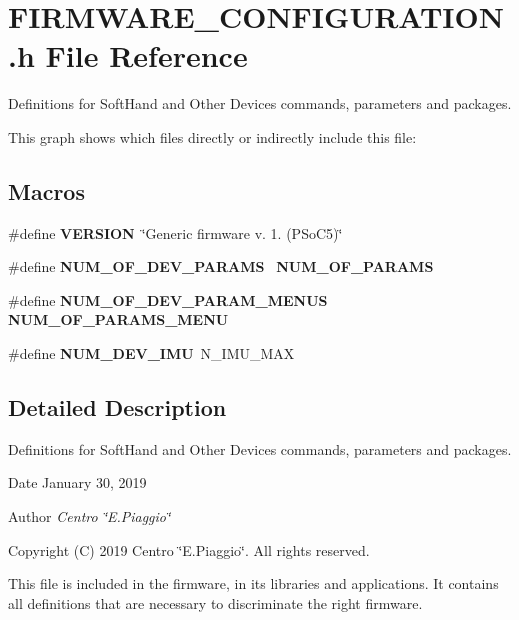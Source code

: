 \section{F\+I\+R\+M\+W\+A\+R\+E\+\_\+\+C\+O\+N\+F\+I\+G\+U\+R\+A\+T\+I\+O\+N.\+h File Reference}
\label{_f_i_r_m_w_a_r_e___c_o_n_f_i_g_u_r_a_t_i_o_n_8h}


Definitions for Soft\+Hand and Other Devices commands, parameters and packages.  


This graph shows which files directly or indirectly include this file\+:
\subsection*{Macros}
\begin{DoxyCompactItemize}
\item 
\mbox{\label{_f_i_r_m_w_a_r_e___c_o_n_f_i_g_u_r_a_t_i_o_n_8h_a1c6d5de492ac61ad29aec7aa9a436bbf}} 
\#define {\bfseries V\+E\+R\+S\+I\+ON}~\char`\"{}Generic firmware v. 1. (P\+So\+C5)\char`\"{}
\item 
\mbox{\label{_f_i_r_m_w_a_r_e___c_o_n_f_i_g_u_r_a_t_i_o_n_8h_ac79ae2689d5f07061b26e1004563f525}} 
\#define {\bfseries N\+U\+M\+\_\+\+O\+F\+\_\+\+D\+E\+V\+\_\+\+P\+A\+R\+A\+MS}~\textbf{ N\+U\+M\+\_\+\+O\+F\+\_\+\+P\+A\+R\+A\+MS}
\item 
\mbox{\label{_f_i_r_m_w_a_r_e___c_o_n_f_i_g_u_r_a_t_i_o_n_8h_aee84094e250fb6a0493716b9d7cecc95}} 
\#define {\bfseries N\+U\+M\+\_\+\+O\+F\+\_\+\+D\+E\+V\+\_\+\+P\+A\+R\+A\+M\+\_\+\+M\+E\+N\+US}~\textbf{ N\+U\+M\+\_\+\+O\+F\+\_\+\+P\+A\+R\+A\+M\+S\+\_\+\+M\+E\+NU}
\item 
\mbox{\label{_f_i_r_m_w_a_r_e___c_o_n_f_i_g_u_r_a_t_i_o_n_8h_a44dee30c25c70368dd064f50fcdc5c21}} 
\#define {\bfseries N\+U\+M\+\_\+\+D\+E\+V\+\_\+\+I\+MU}~N\+\_\+\+I\+M\+U\+\_\+\+M\+AX
\end{DoxyCompactItemize}


\subsection{Detailed Description}
Definitions for Soft\+Hand and Other Devices commands, parameters and packages. 

\begin{DoxyDate}{Date}
January 30, 2019 
\end{DoxyDate}
\begin{DoxyAuthor}{Author}
{\itshape Centro \char`\"{}\+E.\+Piaggio\char`\"{}} 
\end{DoxyAuthor}
\begin{DoxyCopyright}{Copyright}
(C) 2019 Centro \char`\"{}\+E.\+Piaggio\char`\"{}. All rights reserved.
\end{DoxyCopyright}
This file is included in the firmware, in its libraries and applications. It contains all definitions that are necessary to discriminate the right firmware. 